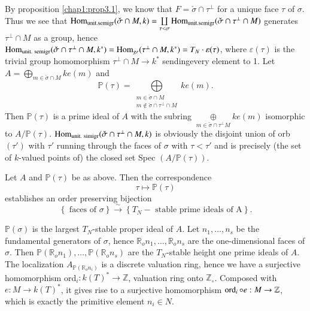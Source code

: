 	By proposition \ref{chap1:prop3.1}, we know that $F= \check{\sigma}\cap
        \tau^\perp$ for a unique face $\tau$ of $\sigma$. Thus we see
        that $\operatorname{Hom}_{\text{unit.semigr}} (\check{\sigma} \cap M, k)=
        \coprod\limits_{\tau < \sigma}
        \operatorname{Hom}_{\text{unit.semigr}}(\check{\sigma}\cap \tau^\perp \cap
        M)$ 
        generates $\tau^\perp \cap M$ as a group, hence
        $\operatorname{Hom}_{\text{unit. semigr}}(\check{\sigma}\cap \tau^{\perp}\cap M,
        k^*)= \operatorname{Hom}_{gr}(\tau^\perp \cap M, k^*)= T_N\cdot \varepsilon
        (\tau)$, where $\varepsilon (\tau)$ is the trivial group homomorphism 
        $\tau^\perp \cap M \to k^*$ sending\pageoriginale  every element
        to 1. Let $A= \bigoplus_{m\in\check{\sigma}\cap M}
        ke (m)$ and   
$$ 
\mathbb{P} (\tau) = \bigoplus\limits_{\substack{m \in \check{ \sigma} 
    \cap M     \\  m \notin \check{\sigma} \cap \tau^\perp \cap M} }  ke(m) .  
$$
Then $\mathbb{P} (\tau)$ is a prime ideal of $A$ with the subring
$\underset{ m \in \check{\sigma} \cap \tau^\perp M}{\oplus} ke (m)$
isomorphic to $A/ \mathbb{P}(\tau)$. $\operatorname{Hom}_{\text{unit. simigr}}
(\check{\sigma} \cap \tau^\perp \cap M, k)$ is obviously the disjoint
union of orb $(\tau')$ 
with $\tau'$ running through the faces of $\sigma$ with $\tau < \tau'$
and is precisely (the set of $k$-valued points of) the closed set
Spec $(A/\mathbb{P} (\tau))$. 

\begin{remark*}
Let $A$ and $\mathbb{P} (\tau)$  be as above. Then the correspondence 
$$
\tau \longmapsto \mathbb{P} (\tau) 
$$
establishes an order preserving bijection 
$$ 
\left\{\text{ faces of } \sigma \right\} \xrightarrow{\sim} \left\{
T_N - \text{ stable prime ideals of A} \right\}.    
$$

 $\mathbb{P}(\sigma)$ is the largest $T_N$-stable proper ideal of
$A$. Let $n_1 , \ldots, n_s $ be the fundamental generators of
$\sigma$, hence $\mathbb{R}_o n_1 ,\ldots, \mathbb{R}_o n_s$ are the
one-dimensional faces of $\sigma$. Then $\mathbb{P}(\mathbb{R}_o n_1)
,\ldots, \mathbb{P}(\mathbb{R}_o n_s)$ are the $T_N$-stable height one
prime ideals of $A$. The localization $A_{\mathbb{P}(\mathbb{R}_o n_i)}$
is a discrete valuation ring, hence we have a surjective homomorphism
ord$_i: k(T)^*  \to \mathbb{Z}$, valuation ring onto
$\mathbb{Z}_\circ$. Composed with $e: M \to k(T)^*$, it gives rise to a
surjective homomorphism $\operatorname{ord}_i \circ e : M \to \mathbb{Z}$, which is
exactly the primitive element $n_i \in N$. 
\end{remark*}

